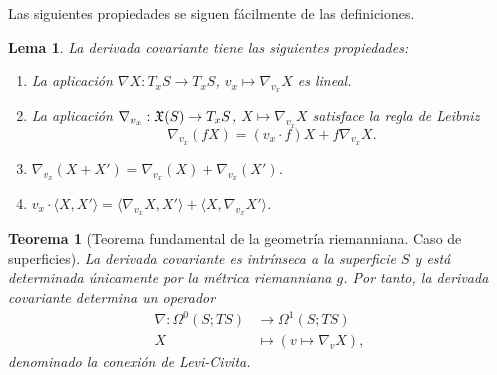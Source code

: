 \documentclass[11pt,a4paper]{amsbook}
\newtheorem{thm}[subsection]{Teorema}
\newtheorem{lemma}[subsection]{Lema}
\theoremstyle{remark} \newtheorem{rmk}[subsection]{Observación}
\theoremstyle{definition} \newtheorem{defn}[subsection]{Definición}
\theoremstyle{definition} \newtheorem{ex}[subsection]{Ejemplo}
\theoremstyle{definition} \newtheorem{ej}[subsection]{Ejercicio}
\begin{document}
Las siguientes propiedades se siguen fácilmente de las definiciones.

\begin{lemma} La derivada covariante tiene las siguientes propiedades:
\begin{enumerate}
\item La aplicación $\nabla X: T_xS \rightarrow T_xS$, $v_x \mapsto \nabla_{v_x}X$ es lineal.
\item La aplicación $\nabla_{v_x}: \mathfrak X(S) \rightarrow T_xS$, $X \mapsto \nabla_{v_x}X$ satisface la regla de Leibniz
        \begin{equation*}
\nabla_{v_x}(fX) = (v_x\cdot f) X + f \nabla_{v_x}X.
        \end{equation*}
\item $\nabla_{v_x}(X+X')=\nabla_{v_x}(X) + \nabla_{v_x}(X')$.
\item $v_x \cdot \langle X, X' \rangle = \langle \nabla_{v_x}X,X'\rangle + \langle X, \nabla_{v_x}X'\rangle$.
\end{enumerate}
\end{lemma}

\begin{thm} [Teorema fundamental de la geometría riemanniana. Caso de superficies]
  La derivada covariante es intrínseca a la superficie $S$ y está determinada únicamente por la métrica riemanniana $g$. Por tanto, la derivada covariante determina un operador
  \begin{align*}
    \nabla: \Omega^0(S;TS) & \longrightarrow \Omega^1(S;TS) \\
      X & \longmapsto (v\mapsto \nabla_v X),
  \end{align*}
  denominado la \emph{conexión de Levi-Civita}.
\end{thm}
\end{document}
